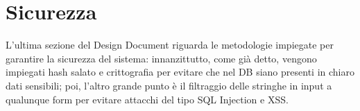 \section{Sicurezza}
L'ultima sezione del Design Document riguarda le metodologie impiegate per garantire la sicurezza del sistema: innanzittutto, come già detto, vengono impiegati hash salato e
crittografia per evitare che nel DB siano presenti in chiaro dati sensibili; poi, l'altro grande punto è il filtraggio delle stringhe in input a qualunque form per evitare attacchi
del tipo SQL Injection e XSS.